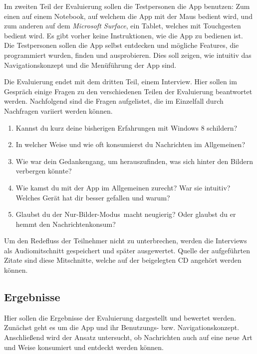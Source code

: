 \documentclass[12pt,a4paper,bibtotoc,abstracton]{scrartcl}
\begin{document}
Im zweiten Teil der Evaluierung sollen die Testpersonen die App benutzen: Zum einen auf einem Notebook, auf welchem die App mit der Maus bedient wird, und zum anderen auf dem \textit{Microsoft Surface}, ein Tablet, welches mit Touchgesten bedient wird. Es gibt vorher keine Instruktionen, wie die App zu bedienen ist. Die Testpersonen sollen die App selbst entdecken und mögliche Features, die programmiert wurden, finden und ausprobieren. Dies soll zeigen, wie intuitiv das Navigationskonzept und die Menüführung der App sind.

Die Evaluierung endet mit dem dritten Teil, einem Interview. Hier sollen im Gespräch einige Fragen zu den verschiedenen Teilen der Evaluierung beantwortet werden. Nachfolgend sind die Fragen aufgelistet, die im Einzelfall durch Nachfragen variiert werden können.

\begin{enumerate}
	\item Kannst du kurz deine bisherigen Erfahrungen mit Windows 8 schildern?
	\item In welcher Weise und wie oft konsumierst du Nachrichten im Allgemeinen? 
	\item Wie war dein Gedankengang, um herauszufinden, was sich hinter den Bildern verbergen könnte?
	\item Wie kamst du mit der App im Allgemeinen zurecht? War sie intuitiv? Welches Gerät hat dir besser gefallen und warum?
	\item Glaubst du der \glqq Nur-Bilder-Modus\grqq\ macht neugierig? Oder glaubst du er hemmt den Nachrichtenkonsum? 
\end{enumerate}

Um den Redefluss der Teilnehmer nicht zu unterbrechen, werden die Interviews als Audiomitschnitt gespeichert und später ausgewertet. Quelle der aufgeführten Zitate sind diese Mitschnitte, welche auf der beigelegten CD angehört werden können.

\subsection{Ergebnisse}
\label{subsec:ergebnisse}
Hier sollen die Ergebnisse der Evaluierung dargestellt und bewertet werden. Zunächst geht es um die App und ihr Benutzungs- bzw. Navigationskonzept. Anschließend wird der Ansatz untersucht, ob Nachrichten auch auf eine neue Art und Weise konsumiert und entdeckt werden können.
\end{document}
